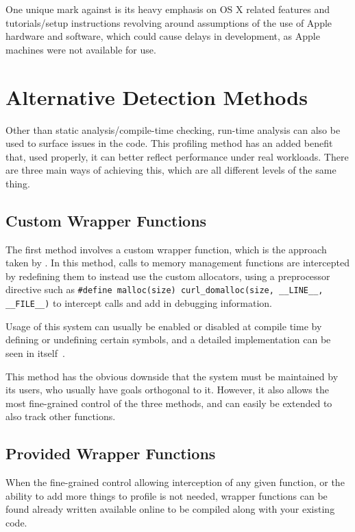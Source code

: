One unique mark against  is its heavy emphasis on OS X related features and tutorials/setup instructions revolving around assumptions of the use of Apple hardware and software, which could cause delays in development, as Apple machines were not available for use.

\section{Alternative Detection Methods}

Other than static analysis/compile-time checking, run-time analysis can also be used to surface issues in the code. This profiling method has an added benefit that, used properly, it can better reflect performance under real workloads. There are three main ways of achieving this, which are all different levels of the same thing.

\subsection{Custom Wrapper Functions}

The first method involves a custom wrapper function, which is the approach taken by . In this method, calls to memory management functions are intercepted by redefining them to instead use the custom allocators, using a preprocessor directive such as \texttt{\#define malloc(size) curl\_domalloc(size, \_\_LINE\_\_, \_\_FILE\_\_)} to intercept calls and add in debugging information.

Usage of this system can usually be enabled or disabled at compile time by defining or undefining certain symbols, and a detailed implementation can be seen in  itself~\cite{curlallocator}.

This method has the obvious downside that the system must be maintained by its users, who usually have goals orthogonal to it. However, it also allows the most fine-grained control of the three methods, and can easily be extended to also track other functions.

\subsection{Provided Wrapper Functions}

When the fine-grained control allowing interception of any given function, or the ability to add more things to profile is not needed, wrapper functions can be found already written available online to be compiled along with your existing code.

